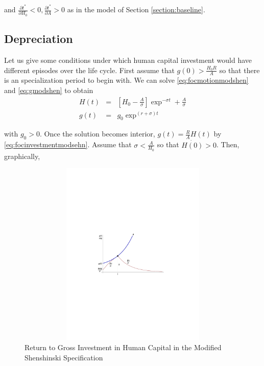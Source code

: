 \noindent and $\frac{\partial t^*}{\partial H_{0}} < 0, \frac{\partial t^*}{\partial A}> 0$ as in the model of Section \ref{section:baseline}. 
 
\subsection{Depreciation}
Let us give some conditions under which human capital investment would have different episodes over the life cycle. First assume that $g(0) > \frac{H_{0} R}{A}$ so that there is an specialization period to begin with. We can solve \eqref{eq:focmotionmodshen} and \eqref{eq:gmodshen} to obtain
\begin{eqnarray}
H(t) &=& \left[ H_{0} - \frac{A}{\sigma} \right] \exp^{- \sigma t} + \frac{A}{\sigma} \nonumber \\
g(t) &=& g_{0} \exp^{(r + \sigma)t} \label{eq:gmodshent1} \nonumber
\end{eqnarray}

\noindent with $g_{0} > 0$. Once the solution becomes interior, $g(t) = \frac{R}{A} H(t)$ by \eqref{eq:focinvestmentmodsehn}. Assume that  $\sigma < \frac{A}{H_{0}}$ so that $\dot{H(0)} > 0$. Then, graphically,

\begin{center}
\begin{figure}[H]
\caption{Return to Gross Investment in Human Capital in the Modified Shenshinski Specification}
\centering
\includegraphics[width=4.5in, height=3.5in]{Figures/fig-shesh-for-intersection.pdf}
\end{figure}
\end{center}


